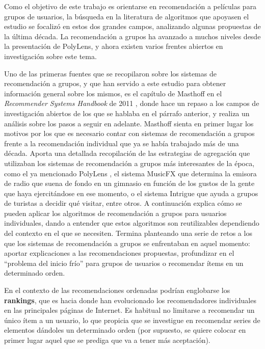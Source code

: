 Como el objetivo de este trabajo es orientarse en recomendación a películas para grupos de usuarios, la búsqueda en la literatura de algoritmos que apoyasen el estudio se focalizó en estos dos grandes campos, analizando algunas propuestas de la última década. La recomendación a grupos ha avanzado a muchos niveles desde la presentación de PolyLens, y ahora existen varios frentes abiertos en investigación sobre este tema.

Uno de las primeras fuentes que se recopilaron sobre los sistemas de recomendación a grupos, y que han servido a este estudio para obtener información general sobre los mismos, es el capítulo de Masthoff en el \textit{Recommender Systems Handbook} de 2011 \cite{masthoff-handbook}, donde hace un repaso a los campos de investigación abiertos de los que se hablaba en el párrafo anterior, y realiza un análisis sobre los pasos a seguir en adelante. Masthoff sienta en primer lugar los motivos por los que es necesario contar con sistemas de recomendación a grupos frente a la recomendación individual que ya se había trabajado más de una década. Aporta una detallada recopilación de las estrategias de agregación que utilizaban los sistemas de recomendación a grupos más interesantes de la época, como el ya mencionado PolyLens \cite{polylens}, el sistema MusicFX \cite{musicfx} que determina la emisora de radio que suena de fondo en un gimnasio en función de los gustos de la gente que haya ejercitándose en ese momento, o el sistema Intrigue \cite{intrigue} que ayuda a grupos de turistas a decidir qué visitar, entre otros. A continuación explica cómo se pueden aplicar los algoritmos de recomendación a grupos para usuarios individuales, dando a entender que estos algoritmos son reutilizables dependiendo del contexto en el que se necesiten. Termina planteando una serie de retos a los que los sistemas de recomendación a grupos se enfrentaban en aquel momento: aportar explicaciones a las recomendaciones propuestas, profundizar en el ``problema del inicio frío'' para grupos de usuarios o recomendar ítems en un determinado orden.

En el contexto de las recomendaciones ordenadas podrían englobarse los \textbf{rankings}, que es hacia donde han evolucionado los recomendadores individuales en las principales páginas de Internet. Es habitual no limitarse a recomendar un único ítem a un usuario, lo que propicia que se investigue en recomendar series de elementos dándoles un determinado orden (por supuesto, se quiere colocar en primer lugar aquel que se prediga que va a tener más aceptación).

